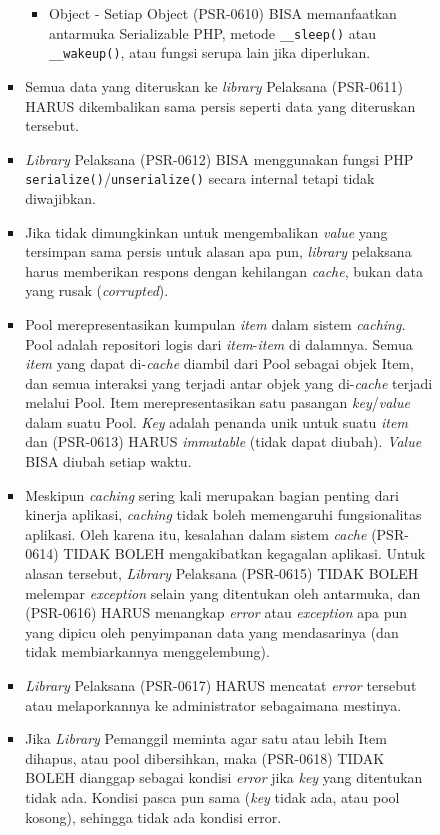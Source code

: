 \documentclass[a4paper,twoside]{article}
\begin{document}
\begin{enumerate}
\begin{enumerate}
\begin{itemize}
\begin{itemize}
\begin{itemize}
						\item Object - Setiap Object (PSR-0610) BISA memanfaatkan antarmuka Serializable PHP, metode \verb|__sleep()| atau \verb|__wakeup()|, atau fungsi serupa lain jika diperlukan.
					\end{itemize}
					\item Semua data yang diteruskan ke \textit{library} Pelaksana (PSR-0611) HARUS dikembalikan sama persis seperti data yang diteruskan tersebut.
					\item \textit{Library} Pelaksana (PSR-0612) BISA menggunakan fungsi PHP \verb|serialize()|/\verb|unserialize()| secara internal tetapi tidak diwajibkan.
					\item Jika tidak dimungkinkan untuk mengembalikan \textit{value} yang tersimpan sama persis untuk alasan apa pun, \textit{library} pelaksana harus memberikan respons dengan kehilangan \textit{cache}, bukan data yang rusak (\textit{corrupted}).
					\item Pool merepresentasikan kumpulan \textit{item} dalam sistem \textit{caching}. Pool adalah repositori logis dari \textit{item}-\textit{item} di dalamnya. Semua \textit{item} yang dapat di-\textit{cache} diambil dari Pool sebagai objek Item, dan semua interaksi yang terjadi antar objek yang di-\textit{cache} terjadi melalui Pool.
					Item merepresentasikan satu pasangan \textit{key}/\textit{value} dalam suatu Pool. \textit{Key} adalah penanda unik untuk suatu \textit{item} dan (PSR-0613) HARUS \textit{immutable} (tidak dapat diubah). \textit{Value} BISA diubah setiap waktu.
					\item Meskipun \textit{caching} sering kali merupakan bagian penting dari kinerja aplikasi, \textit{caching} tidak boleh memengaruhi fungsionalitas aplikasi. Oleh karena itu, kesalahan dalam sistem \textit{cache} (PSR-0614) TIDAK BOLEH mengakibatkan kegagalan aplikasi. Untuk alasan tersebut, \textit{Library}  Pelaksana (PSR-0615) TIDAK BOLEH melempar \textit{exception} selain yang ditentukan oleh antarmuka, dan (PSR-0616) HARUS menangkap \textit{error} atau \textit{exception} apa pun yang dipicu oleh penyimpanan data yang mendasarinya (dan tidak membiarkannya menggelembung).
					\item \textit{Library} Pelaksana (PSR-0617) HARUS mencatat \textit{error} tersebut atau melaporkannya ke administrator sebagaimana mestinya.
					\item Jika \textit{Library} Pemanggil meminta agar satu atau lebih Item dihapus, atau pool dibersihkan, maka (PSR-0618) TIDAK BOLEH dianggap sebagai kondisi \textit{error} jika \textit{key} yang ditentukan tidak ada. Kondisi pasca pun sama (\textit{key} tidak ada, atau pool kosong), sehingga tidak ada kondisi error.
				\end{itemize}
				

\end{itemize}
\end{enumerate}
\end{enumerate}
\end{document}
